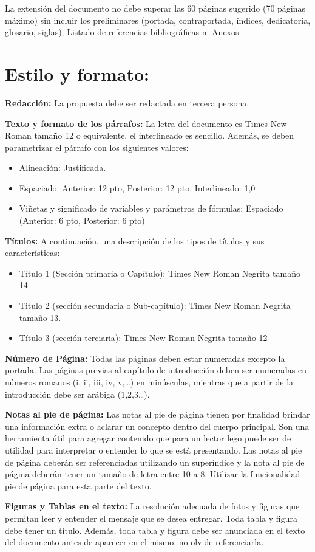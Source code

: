\documentclass[12pt,letterpaper]{report}
\begin{document}
La extensión del documento no debe superar las 60 páginas sugerido (70 páginas máximo) sin incluir los preliminares (portada, contraportada, índices, dedicatoria, glosario, siglas); Listado de referencias bibliográficas ni Anexos.

\section*{Estilo y formato:}

\textbf{Redacción:} La propuesta debe ser redactada en tercera persona.

\textbf{Texto y formato de los párrafos:} La letra del documento es Times New Roman tamaño 12 o equivalente, el interlineado es sencillo. Además, se deben parametrizar el párrafo con los siguientes valores:

\begin{itemize}
    \setlength\itemsep{6pt}
    \item Alineación: Justificada.
    \item Espaciado: Anterior: 12 pto, Posterior: 12 pto, Interlineado: 1,0
    \item Viñetas y significado de variables y parámetros de fórmulas: Espaciado (Anterior: 6 pto, Posterior: 6 pto)
\end{itemize}

\textbf{Títulos:} A continuación, una descripción de los tipos de títulos y sus características:

\begin{itemize}
    \setlength\itemsep{6pt}
    \item Título 1 (Sección primaria o Capítulo): Times New Roman Negrita tamaño 14
    \item Titulo 2 (sección secundaria o Sub-capítulo): Times New Roman Negrita tamaño 13.
    \item Título 3 (sección terciaria): Times New Roman Negrita tamaño 12
\end{itemize}

\textbf{Número de Página:} Todas las páginas deben estar numeradas excepto la portada. Las páginas previas al capítulo de introducción deben ser numeradas en números romanos (i, ii, iii, iv, v,…) en minúsculas, mientras que a partir de la introducción debe ser arábiga (1,2,3…).

\textbf{Notas al pie de página:} Las notas al pie de página tienen por finalidad brindar una información extra o aclarar un concepto dentro del cuerpo principal. Son una herramienta útil para agregar contenido que para un lector lego puede ser de utilidad para interpretar o entender lo que se está presentando. Las notas al pie de página deberán ser referenciadas utilizando un superíndice y la nota al pie de página deberán tener un tamaño de letra entre 10 a 8. Utilizar la funcionalidad pie de página para esta parte del texto.

\textbf{Figuras y Tablas en el texto:} La resolución adecuada de fotos y figuras que permitan leer y entender el mensaje que se desea entregar. Toda tabla y figura debe tener un título. Además, toda tabla y figura debe ser anunciada en el texto del documento antes de aparecer en el mismo, no olvide referenciarla.
\end{document}
